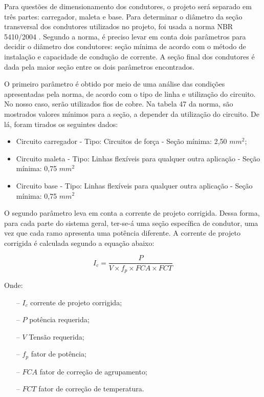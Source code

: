 \par Para questões de dimensionamento dos condutores, o projeto será separado em três partes: carregador, maleta e base. Para determinar o diâmetro da seção transversal dos condutores utilizados no projeto, foi usada a norma NBR 5410/2004 \cite{NBR5410}. Segundo a norma, é preciso levar em conta dois parâmetros para decidir o diâmetro dos condutores: seção mínima de acordo com o método de instalação e capacidade de condução de corrente. A seção final dos condutores é dada pela maior seção entre os dois parâmetros encontrados.

\par O primeiro parâmetro é obtido por meio de uma análise das condições apresentadas pela norma, de acordo com o tipo de linha e utilização do circuito. No nosso caso, serão utilizados fios de cobre. Na tabela 47 da norma, são mostrados valores mínimos para a seção, a depender da utilização do circuito. De lá, foram tirados os seguintes dados:

\begin{itemize}
    \item Circuito carregador - Tipo: Circuitos de força - Seção mínima: 2,50 $mm^2$;
    \item Circuito maleta - Tipo: Linhas flexíveis para qualquer outra aplicação - Seção mínima: 0,75 $mm^2$
    \item Circuito base - Tipo: Linhas flexíveis para qualquer outra aplicação - Seção mínima: 0,75 $mm^2$
\end{itemize}

\par O segundo parâmetro leva em conta a corrente de projeto corrigida. Dessa forma, para cada parte do sistema geral, ter-se-á uma seção específica de condutor, uma vez que cada ramo apresenta uma potência diferente. A corrente de projeto corrigida é calculada segundo a equação abaixo:

\begin{equation}
    I_{c} = \frac{P}{V \times f_{p} \times FCA \times FCT}
\end{equation}

\par Onde:

\begin{itemize}
    \item [--] $I_{c}$ corrente de projeto corrigida;
    \item [--] $P$ potência requerida;
    \item [--] $V$ Tensão requerida;
    \item [--] $f_{p}$ fator de potência;
    \item [--] $FCA$ fator de correção de agrupamento;
    \item [--] $FCT$  fator de correção de temperatura.
\end{itemize}

